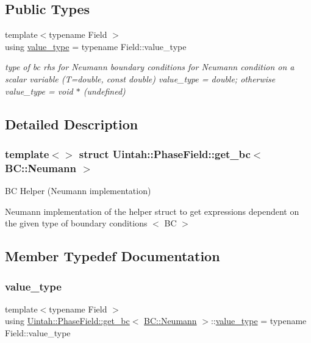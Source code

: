 \subsection*{Public Types}
\begin{DoxyCompactItemize}
\item 
{\footnotesize template$<$typename Field $>$ }\\using \hyperlink{structUintah_1_1PhaseField_1_1get__bc_3_01BC_1_1Neumann_01_4_ad054f0bfaf357015c87c8fe22c7aa74d}{value\+\_\+type} = typename Field\+::value\+\_\+type
\begin{DoxyCompactList}\small\item\em type of bc rhs for Neumann boundary conditions for Neumann condition on a scalar variable (T=double, const double) value\+\_\+type = double; otherwise value\+\_\+type = void $\ast$ (undefined) \end{DoxyCompactList}\end{DoxyCompactItemize}


\subsection{Detailed Description}
\subsubsection*{template$<$$>$\newline
struct Uintah\+::\+Phase\+Field\+::get\+\_\+bc$<$ B\+C\+::\+Neumann $>$}

BC Helper (Neumann implementation) 

Neumann implementation of the helper struct to get expressions dependent on the given type of boundary conditions $<$ BC $>$ 

\subsection{Member Typedef Documentation}
\mbox{\label{structUintah_1_1PhaseField_1_1get__bc_3_01BC_1_1Neumann_01_4_ad054f0bfaf357015c87c8fe22c7aa74d}} 
\subsubsection{\texorpdfstring{value\+\_\+type}{value\_type}}
{\footnotesize\ttfamily template$<$typename Field $>$ \\
using \hyperlink{structUintah_1_1PhaseField_1_1get__bc}{Uintah\+::\+Phase\+Field\+::get\+\_\+bc}$<$ \hyperlink{namespaceUintah_1_1PhaseField_a148fba372aa3be96fd6eede7a2fa10b5ab8537a769dbc90cb1762215441212152}{B\+C\+::\+Neumann} $>$\+::\hyperlink{structUintah_1_1PhaseField_1_1get__bc_3_01BC_1_1Neumann_01_4_ad054f0bfaf357015c87c8fe22c7aa74d}{value\+\_\+type} =  typename Field\+::value\+\_\+type}



